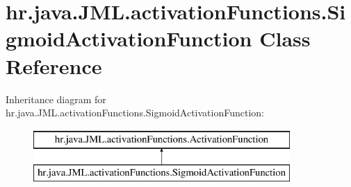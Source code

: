 \hypertarget{classhr_1_1java_1_1_j_m_l_1_1activation_functions_1_1_sigmoid_activation_function}{\section{hr.\+java.\+J\+M\+L.\+activation\+Functions.\+Sigmoid\+Activation\+Function Class Reference}
\label{classhr_1_1java_1_1_j_m_l_1_1activation_functions_1_1_sigmoid_activation_function}
}
Inheritance diagram for hr.\+java.\+J\+M\+L.\+activation\+Functions.\+Sigmoid\+Activation\+Function\+:\begin{figure}[H]
\begin{center}
\leavevmode
\includegraphics[height=2.000000cm]{classhr_1_1java_1_1_j_m_l_1_1activation_functions_1_1_sigmoid_activation_function}
\end{center}
\end{figure}
